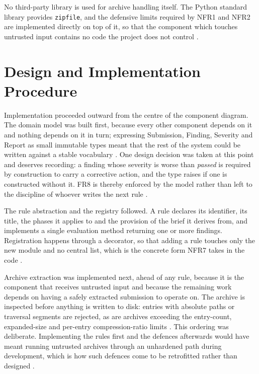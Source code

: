 \documentclass[a4paper,11pt]{article}
\begin{document}
No third-party library is used for archive handling itself. The Python standard
library provides \texttt{zipfile}, and the defensive limits required by NFR1 and
NFR2 are implemented directly on top of it, so that the component which touches
untrusted input contains no code the project does not control
\citep{PSF2025}.

\section{Design and Implementation Procedure}\label{sec:procedure}

Implementation proceeded outward from the centre of the component diagram. The
domain model was built first, because every other component depends on it and
nothing depends on it in turn; expressing Submission, Finding, Severity and
Report as small immutable types meant that the rest of the system could be
written against a stable vocabulary \citep{Percival2020}. One design decision
was taken at this point and deserves recording: a finding whose severity is
worse than \textit{passed} is required by construction to carry a corrective
action, and the type raises if one is constructed without it. FR8 is thereby
enforced by the model rather than left to the discipline of whoever writes the
next rule \citep{Khorikov2020}.

The rule abstraction and the registry followed. A rule declares its identifier,
its title, the phases it applies to and the provision of the brief it derives
from, and implements a single evaluation method returning one or more findings.
Registration happens through a decorator, so that adding a rule touches only the
new module and no central list, which is the concrete form NFR7 takes in the
code \citep{Richards2020}.

Archive extraction was implemented next, ahead of any rule, because it is the
component that receives untrusted input and because the remaining work depends
on having a safely extracted submission to operate on. The archive is inspected
before anything is written to disk: entries with absolute paths or traversal
segments are rejected, as are archives exceeding the entry-count, expanded-size
and per-entry compression-ratio limits \citep{OWASP2021}. This ordering was
deliberate. Implementing the rules first and the defences afterwards would have
meant running untrusted archives through an unhardened path during development,
which is how such defences come to be retrofitted rather than designed
\citep{NIST2022}.
\end{document}
